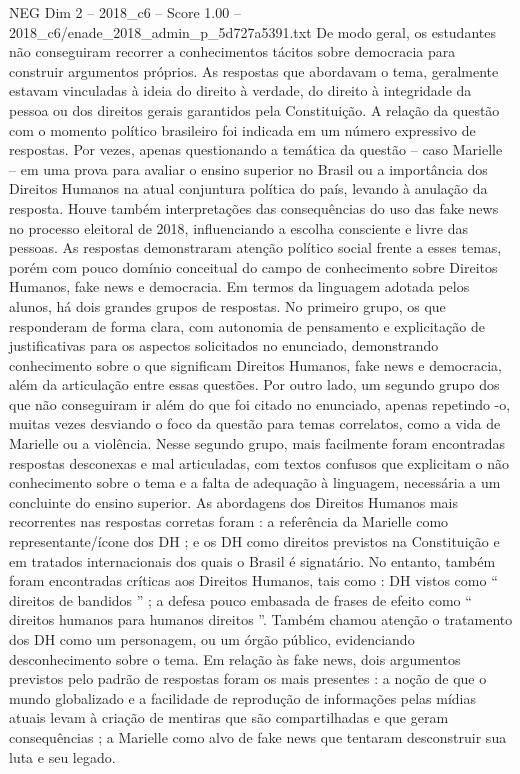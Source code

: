 \begin{textsample}{NEG Dim 2 – 2018\_c6 – Score 1.00 – 2018\_c6/enade\_2018\_admin\_p\_5d727a5391.txt}
De modo geral, os estudantes não conseguiram recorrer a conhecimentos tácitos sobre democracia para construir argumentos próprios.
As respostas que abordavam o tema, geralmente estavam vinculadas à ideia do direito à verdade, do direito à integridade da pessoa ou dos direitos gerais garantidos pela Constituição.
A relação da questão com o momento político brasileiro foi indicada em um número expressivo de respostas.
Por vezes, apenas questionando a temática da questão – caso Marielle – em uma prova para avaliar o ensino superior no Brasil ou a importância dos Direitos Humanos na atual conjuntura política do país, levando à anulação da resposta.
Houve também interpretações das consequências do uso das fake news no processo eleitoral de 2018, influenciando a escolha consciente e livre das pessoas.
As respostas demonstraram atenção político social frente a esses temas, porém com pouco domínio conceitual do campo de conhecimento sobre Direitos Humanos, fake news e democracia.
Em termos da linguagem adotada pelos alunos, há dois grandes grupos de respostas.
No primeiro grupo, os que responderam de forma clara, com autonomia de pensamento e explicitação de justificativas para os aspectos solicitados no enunciado, demonstrando conhecimento sobre o que significam Direitos Humanos, fake news e democracia, além da articulação entre essas questões.
Por outro lado, um segundo grupo dos que não conseguiram ir além do que foi citado no enunciado, apenas repetindo -o, muitas vezes desviando o foco da questão para temas correlatos, como a vida de Marielle ou a violência.
Nesse segundo grupo, mais facilmente foram encontradas respostas desconexas e mal articuladas, com textos confusos que explicitam o não conhecimento sobre o tema e a falta de adequação à linguagem, necessária a um concluinte do ensino superior.
As abordagens dos Direitos Humanos mais recorrentes nas respostas corretas foram : a referência da Marielle como representante/ícone dos DH ; e os DH como direitos previstos na Constituição e em tratados internacionais dos quais o Brasil é signatário.
No entanto, também foram encontradas críticas aos Direitos Humanos, tais como : DH vistos como “ direitos de bandidos ” ; a defesa pouco embasada de frases de efeito como “ direitos humanos para humanos direitos ”.
Também chamou atenção o tratamento dos DH como um personagem, ou um órgão público, evidenciando desconhecimento sobre o tema.
Em relação às fake news, dois argumentos previstos pelo padrão de respostas foram os mais presentes : a noção de que o mundo globalizado e a facilidade de reprodução de informações pelas mídias atuais levam à criação de mentiras que são compartilhadas e que geram consequências ; a Marielle como alvo de fake news que tentaram desconstruir sua luta e seu legado.

\end{textsample}
